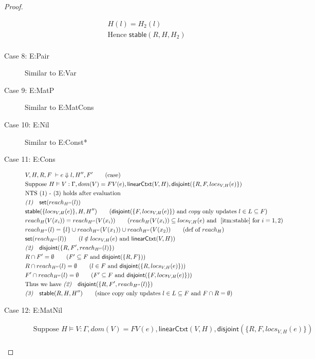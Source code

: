 \documentclass{easychair}
\newcommand{\ms}[1]{\ensuremath{\mathsf{#1}}}
\newcommand{\na}[1]{\mathsf{linearCtxt}(#1)}
\newcommand{\stable}[1]{\mathsf{stable}(#1)}
\newcommand{\set}[1]{\mathsf{set}(#1)}
\newcommand{\dist}[1]{\mathsf{disjoint}(#1)}
\theoremstyle{definition}
\begin{document}
\begin{proof}
\begin{description}
\begin{align*}
  &H(l) = H_2(l)\\
  &\text{Hence } \stable{R,H,H_2}\\
  \end{align*}
  \item[Case 8: E:Pair]
  Similar to E:Var
  \item[Case 9: E:MatP]
  Similar to E:MatCons
  \item[Case 10: E:Nil]
  Similar to E:Const*
  \item[Case 11: E:Cons]
  \begin{align*}
  &V,H,R,F \; \vdash e \Downarrow l,H'',F' \tag{case}\\
  &\text{Suppose } H \vDash V : \Gamma, dom(V) = FV(e), \na{V,H}, \dist{\{R,F,locs_{V,H}(e)\}}\\
  &\text{NTS (1) - (3) holds after evaluation }\\
  &\emph{(1)} \quad \ms{set}(reach_{H''}(l))\\
  &\stable{\{locs_{V,H}(e)\},H,H''} \tag{$\dist{\{F,locs_{V,H}(e)\}}$ and $copy$ only updates $l \in L \subseteq F$}\\
  &reach_H(V(x_i)) = reach_{H''}(V(x_i)) \tag{$reach_H(V(x_i)) \subseteq locs_{V,H}(e)$ and $~\ref{itm:stable}$ for $i = 1,2$}\\
  &reach_{H''}(l) = \{l\} \cup reach_{H''}(V(x_1))\cup reach_{H''}(V(x_2)) \tag{def of $reach_H$}\\
  &\set{reach_{H''}(l)} \tag{$l \notin locs_{V,H}(e)$ and $\na{V,H}$}\\ 
  &\emph{(2)} \quad \dist{\{R,F',reach_{H''}(l)\}}\\
  &R \cap F' = \emptyset \tag{$F' \subseteq F$ and $\dist{\{R,F\}}$}\\
  &R \cap reach_{H''}(l) = \emptyset \tag{$l \in F$ and $\dist{\{R,locs_{V,H}(e)\}}$}\\
  &F' \cap reach_{H''}(l) = \emptyset\tag{$F' \subseteq F$ and $\dist{\{F,locs_{V,H}(e)\}}$}\\
  &\text{Thus we have }\emph{(2)} \quad \dist{\{R,F',reach_{H''}(l)\}}\\
  &\emph{(3)} \quad \stable{R,H,H''} \tag{since copy only updates $l \in L \subseteq F$ and $F \cap R = \emptyset$}\\
  \end{align*}
  \item[Case 12: E:MatNil]
  \begin{align*}
  &\text{Suppose } H \vDash V : \Gamma, dom(V) = FV(e), \na{V,H}, \dist{\{R,F,locs_{V,H}(e)\}}\\

\end{align*}
\end{description}
\end{proof}
\end{document}
